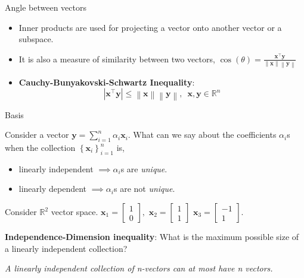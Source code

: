 \documentclass[aspectratio=169]{beamer}
\let\olditem\item
\renewcommand{\item}{\setlength{\itemsep}{\fill}\olditem}
\begin{document}
\begin{frame}[t]{Angle between vectors}
\vspace{-0.5cm}
\begin{itemize}
    \item Inner products are used for projecting a vector onto another vector or a subspace.
    \item It is also a measure of similarity between two vectors, $\cos \left(\theta\right) = \frac{\mathbf{x}^\top\mathbf{y}}{\left\lVert \mathbf{x}\right\rVert \left\lVert \mathbf{y}\right\rVert}$
    \item \textbf{Cauchy-Bunyakovski-Schwartz Inequality}:
    \[ \left\lvert \mathbf{x}^\top\mathbf{y} \right\rvert \leq \left\lVert \mathbf{x} \right\rVert \left\lVert \mathbf{y} \right\rVert, \,\,\, \mathbf{x}, \mathbf{y} \in \mathbb{R}^n \]
\end{itemize}
\end{frame}


\begin{frame}[t]{Basis}
  \begin{small}
  \noindent Consider a vector $\mathbf{y} = \sum_{i=1}^n\alpha_i\mathbf{x}_i$. What can we say about the coefficients $\alpha_i$s when the collection $\left\{\mathbf{x}_i\right\}_{i=1}^n$ is,
  \begin{itemize}
  \item linearly independent $\implies \alpha_i$s are \textit{unique}.
  \item linearly dependent $\implies \alpha_i$s are not \textit{unique}.
  \end{itemize}
  
  Consider $\mathbb{R}^2$ vector space. $\mathbf{x}_1=\begin{bmatrix}1\\0\end{bmatrix}, \,\, \mathbf{x}_2=\begin{bmatrix}1\\1\end{bmatrix} \,\, \mathbf{x}_3 = \begin{bmatrix}-1\\1\end{bmatrix}$.
  \begin{center}
  \end{center}
  \noindent \textbf{Independence-Dimension inequality}: What is the maximum possible size of a linearly independent collection?
  \begin{center}\textit{A linearly independent collection of n-vectors can at most have n vectors.}\end{center}
  \end{small}
  \end{frame}
  
\end{document}
